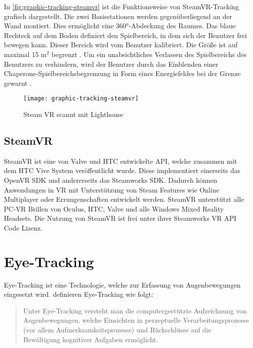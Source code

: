 In \autoref{fig:graphic-tracking-steamvr} ist die Funktionsweise von SteamVR-Tracking grafisch dargestellt. Die zwei Basisstationen werden gegenüberliegend an der Wand montiert. Dies ermöglicht eine 360°-Abdeckung des Raumes. Das blaue Rechteck auf dem Boden definiert den Spielbereich, in dem sich der Benutzer frei bewegen kann. Dieser Bereich wird vom Benutzer kalibriert. Die Größe ist auf maximal 15 m$^2$ begrenzt \cite{ViveProduct}. Um ein unabsichtliches Verlassen des Spielbereichs des Benutzers zu verhindern, wird der Benutzer durch das Einblenden einer Chaperone-Spielbereichsbegrenzung in Form eines Energiefeldes bei der Grenze gewarnt \cite{ViveProduct}. 

\begin{figure}[!htbp]
	\centering
	\texttt{[image: graphic-tracking-steamvr]}
	\caption[Steam VR scannt mit Lighthouse]{Steam VR scannt mit Lighthouse \cite{Sauter.2015}}
	\label{fig:graphic-tracking-steamvr}
\end{figure}

\subsection{SteamVR}
\label{section:steamvr}
SteamVR ist eine von Valve und HTC entwickelte API, welche zusammen mit dem HTC Vive System veröffentlicht wurde. Diese implementiert einerseits das OpenVR \ac{SDK} und andererseits das Steamworks \ac{SDK}. Dadurch können Anwendungen in VR mit Unterstützung von Steam Features wie Online Multiplayer oder Errungenschaften entwickelt werden. SteamVR unterstützt alle PC-\ac{VR} Brillen von Oculus, HTC, Valve und alle Windows Mixed Reality Headsets. Die Nutzung von SteamVR ist frei unter ihrer Steamworks VR API Code Lizenz. \cite{steamvr.2020}

\section{Eye-Tracking}
\label{section:eyetracking}
Eye-Tracking ist eine Technologie, welche zur Erfassung von Augenbewegungen eingesetzt wird. \citeauthor{BartlPokorny.2013} definieren Eye-Tracking wie folgt: 

\begin{quote}
	\glqq Unter Eye-Tracking versteht man die computergestützte Aufzeichnung von Augenbewegungen, welche Einsichten in perzeptuelle Verarbeitungsprozesse (vor allem Aufmerksamkeitsprozesse) und Rückschlüsse auf die Bewältigung kognitiver Aufgaben ermöglicht.\grqq{} \cite{BartlPokorny.2013} 
\end{quote}

